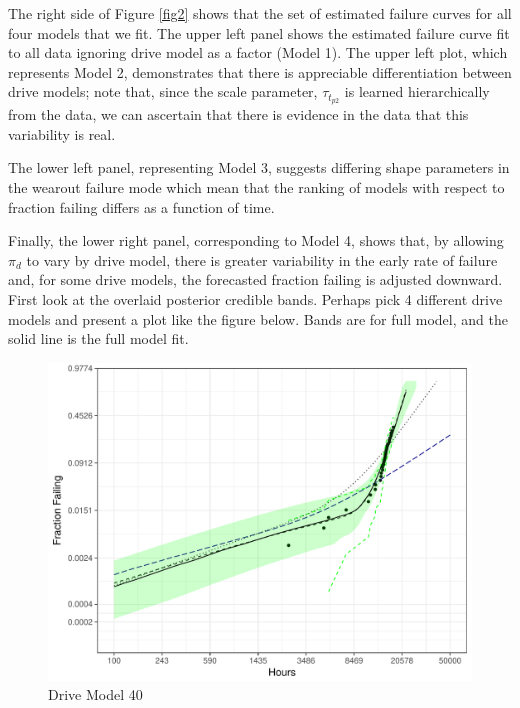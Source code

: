 \documentclass[12pt]{article}
\begin{document}
The right side of Figure \ref{fig2} shows that the set of estimated failure curves for all four models that we fit. The upper left panel shows the estimated failure curve fit to all data ignoring drive model as a factor (Model 1). The upper left plot, which represents Model 2, demonstrates that there is appreciable differentiation between drive models; note that, since the scale parameter, $\tau_{t_{p2}}$ is learned hierarchically from the data, we can ascertain that there is evidence in the data that this variability is real.

The lower left panel, representing Model 3, suggests differing shape parameters in the wearout failure mode which mean that the ranking of models with respect to fraction failing differs as a function of time.

Finally, the lower right panel, corresponding to Model 4, shows that, by allowing $\pi_d$ to vary by drive model, there is greater variability in the early rate of failure and, for some drive models, the forecasted fraction failing is adjusted downward. 
First look at the overlaid posterior credible bands.  Perhaps pick 4 different drive models and present a plot like the figure below.  Bands are for full model, and the solid line is the full model fit. \\

\begin{figure}[H]
    \centering
   \includegraphics[width=5.0in]{fig/mod40_bands.pdf}
		\caption{Drive Model 40 \label{fig:first}} 
\end{figure}
\end{document}
